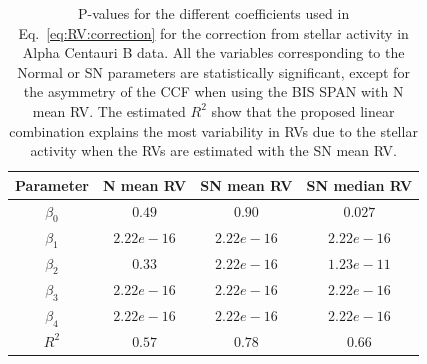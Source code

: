 \documentclass{aa}
\begin{document}
\begin{table}
\begin{center}
\caption{P-values for the different coefficients used in Eq.~\eqref{eq:RV:correction} for the correction from stellar activity in Alpha Centauri B data. All the variables corresponding to the Normal or SN parameters are statistically significant, except for the asymmetry of the CCF when using the BIS SPAN with N mean RV.
The estimated $R^2$ show that the proposed linear combination explains the most variability in RVs due to the stellar activity when the RVs are estimated with the SN mean RV.}
\label{table:alphacent.test}
\begin{tabular}{|c|c|c|c|}
\hline
Parameter          & N mean RV         &   SN mean RV &   SN median RV \\
\hline
$\beta_{0}$            &    $0.49$    & $0.90 $  & $0.027$ \\
\hline
$\beta_{1}$            &    $2.22e-16$    & $2.22e-16 $  & $2.22e-16$ \\
\hline
$\beta_{2}$            &     $0.33$   & $2.22e-16 $ & $1.23e-11$\\
\hline
$\beta_{3}$            &     $ 2.22e-16$   &  $2.22e-16 $  & $ 2.22e-16$\\
\hline
$\beta_{4}$            &     $2.22e-16$   &  $2.22e-16 $ & $ 2.22e-16 $\\
\hline
$R^{2}$      &     $0.57$    &  $0.78$ & $0.66$  \\
\hline
\end{tabular}
\end{center}
\end{table}

\end{document}
